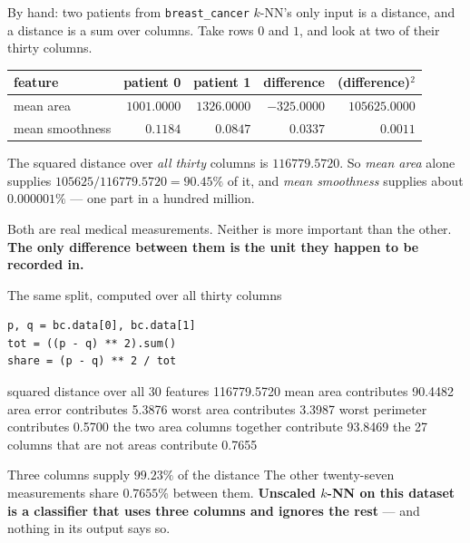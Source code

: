 \documentclass[aspectratio=169]{beamer}
\begin{document}
\begin{frame}[shrink=8]{By hand: two patients from
\texttt{breast\_cancer}}
$k$-NN's only input is a distance, and a distance is a sum over columns. Take
rows $0$ and $1$, and look at two of their thirty columns.
\begin{center}\small
\begin{tabular}{@{}lrrrr@{}}
  \toprule
  feature & patient 0 & patient 1 & difference & (difference)$^2$\\
  \midrule
  mean area & $1001.0000$ & $1326.0000$ & $-325.0000$ & $105625.0000$\\
  mean smoothness & $0.1184$ & $0.0847$ & $0.0337$ & $0.0011$\\
  \bottomrule
\end{tabular}
\end{center}
\begin{center}\small
  The squared distance over \emph{all thirty} columns is $116779.5720$. So
  \emph{mean area} alone supplies $105625 / 116779.5720 = \mathbf{90.45\%}$
  of it, and \emph{mean smoothness} supplies about
  $\mathbf{0.000001\%}$ --- one part in a hundred million.
\end{center}
\begin{alertblock}{}
  \centering\footnotesize
  Both are real medical measurements. Neither is more important than the
  other. \textbf{The only difference between them is the unit they happen to
  be recorded in.}
\end{alertblock}
\end{frame}

\begin{frame}[fragile,shrink=6]{The same split, computed over all thirty
columns}
\begin{lstlisting}
p, q = bc.data[0], bc.data[1]
tot = ((p - q) ** 2).sum()
share = (p - q) ** 2 / tot
\end{lstlisting}
\begin{outblk}
squared distance over all 30 features 116779.5720
  mean area                contributes  90.4482%
  area error               contributes   5.3876%
  worst area               contributes   3.3987%
  worst perimeter          contributes   0.5700%
the two area columns together contribute 93.8469%
the 27 columns that are not areas contribute 0.7655%
\end{outblk}
\begin{alertblock}{Three columns supply $99.23\%$ of the distance}
  \footnotesize The other twenty-seven measurements share $\mathbf{0.7655\%}$
  between them. \textbf{Unscaled $k$-NN on this dataset is a classifier that
  uses three columns and ignores the rest} --- and nothing in its output says
  so.
\end{alertblock}
\end{frame}
\end{document}
